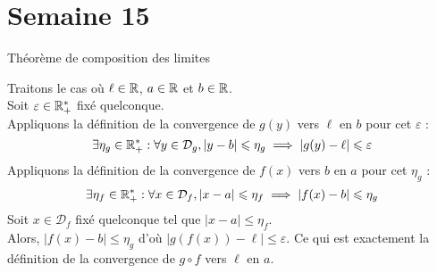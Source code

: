 \documentclass{article}
\renewenvironment{question_kholle}[2][ ]
{
	\subsection{\texorpdfstring{#2}{}}
	\notblank{#1}
	{
		\noindent #1
		\bigbreak
	}
	{}
	\begin{proof}
}
{
	\end{proof}
}
\begin{document}
\pagebreak\section{Semaine 15}

\begin{question_kholle}
	{Théorème de composition des limites}

	Traitons le cas où $\ell \in \mathbb R$, $a \in \mathbb R$ et $b \in \mathbb R$. \\
	Soit $\varepsilon \in \mathbb R_+^*$ fixé quelconque. \\
	Appliquons la définition de la convergence de $g(y)$ vers $\ell$ en $b$ pour cet $\varepsilon$ :
	\begin{equation*}
		\exists \eta_g \in \mathbb R_+^* : \forall y \in \mathcal{D}_g, | y - b | \leqslant \eta_g \implies | g(y) - \ell | \leqslant \varepsilon
	\end{equation*}
	Appliquons la définition de la convergence de $f(x)$ vers $b$ en $a$ pour cet $\eta_g$ :
	\begin{equation*}
		\exists \eta_f \in \mathbb R_+^* : \forall x \in \mathcal{D}_f, | x - a | \leqslant \eta_f \implies | f(x) - b | \leqslant \eta_g
	\end{equation*}
	Soit $x \in \mathcal{D}_{f}$ fixé quelconque tel que $ | x - a | \leqslant \eta_{f} $.\\
	Alors, $ | f(x) - b | \leqslant \eta_g $ d'où $ | g(f(x)) - \ell | \leqslant \varepsilon $. Ce qui est exactement la définition de la convergence de $g\circ f$ vers $\ell$ en $a$.
\end{question_kholle}
\end{document}
